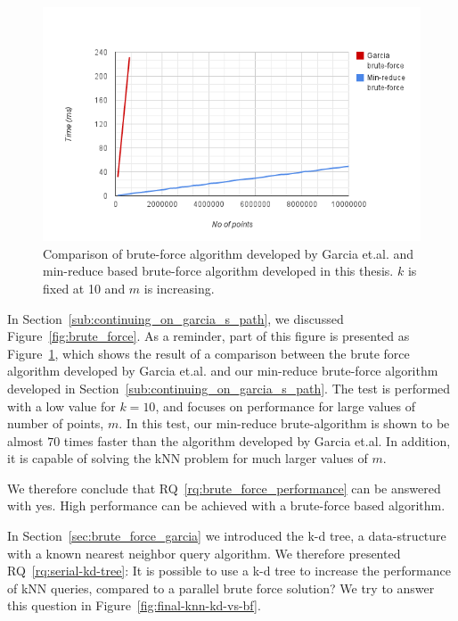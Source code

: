 \begin{figure}[ht!]
    \centering
    \includegraphics[width=120mm]{../gfx/fin-garcia-vs-min-reduce.png}
    \caption{Comparison of brute-force algorithm developed by Garcia et.al. and min-reduce based brute-force algorithm developed in this thesis. $k$ is fixed at 10 and $m$ is increasing.}
    \label{fig:fin-garcia-vs-min-reduce}
\end{figure}

In Section~\ref{sub:continuing_on_garcia_s_path}, we discussed Figure~\ref{fig:brute_force}. As a reminder, part of this figure is presented as Figure~\ref{fig:fin-garcia-vs-min-reduce}, which shows the result of a comparison between the brute force algorithm developed by Garcia et.al. and our min-reduce brute-force algorithm developed in Section~\ref{sub:continuing_on_garcia_s_path}. The test is performed with a low value for $k=10$, and focuses on performance for large values of number of points, $m$. In this test, our min-reduce brute-algorithm is shown to be almost $70$ times faster than the algorithm developed by Garcia et.al. In addition, it is capable of solving the kNN problem for much larger values of $m$.

We therefore conclude that RQ~\ref{rq:brute_force_performance} can be answered with yes. High performance can be achieved with a brute-force based algorithm.

In Section~\ref{sec:brute_force_garcia} we introduced the k-d tree, a data-structure with a known  nearest neighbor query algorithm. We therefore presented RQ~\ref{rq:serial-kd-tree}: It is possible to use a k-d tree to increase the performance of kNN queries, compared to a parallel brute force solution? We try to answer this question in Figure~\ref{fig:final-knn-kd-vs-bf}.

